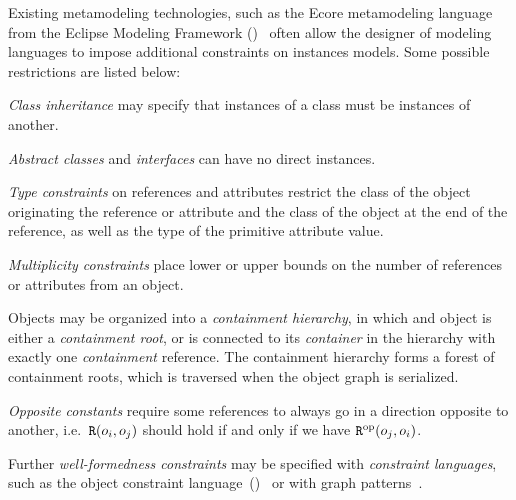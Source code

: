 Existing metamodeling technologies, such as the Ecore metamodeling language from the Eclipse Modeling Framework ()~\citep{Steinberg09emf} often allow the designer of modeling languages to impose additional constraints on instances models. Some possible restrictions are listed below: 
\begin{itemize*}
\item \emph{Class inheritance} may specify that instances of a class must be instances of another.
\item \emph{Abstract classes} and \emph{interfaces} can have no direct instances.
\item \emph{Type constraints} on references and attributes restrict the class of the object originating the reference or attribute and the class of the object at the end of the reference, as well as the type of the primitive attribute value.
\item \emph{Multiplicity constraints} place lower or upper bounds on the number of references or attributes from an object.
\item Objects may be organized into a \emph{containment hierarchy}, in which and object is either a \emph{containment root}, or is connected to its \emph{container} in the hierarchy with exactly one \emph{containment} reference. The containment hierarchy forms a forest of containment roots, which is traversed when the object graph is serialized.
\item \emph{Opposite constants} require some references to always go in a direction opposite to another, i.e.~\(\texttt{\upshape R}(o_i, o_j)\) should hold if and only if we have \(\texttt{\upshape R}^{\textrm{op}}(o_j, o_i)\).
\end{itemize*}

Further \emph{well-formedness constraints} may be specified with \emph{constraint languages}, such as the object constraint language~()~\citep{OMG14ocl} or with graph patterns~\citep{Bergmann11validation}.

